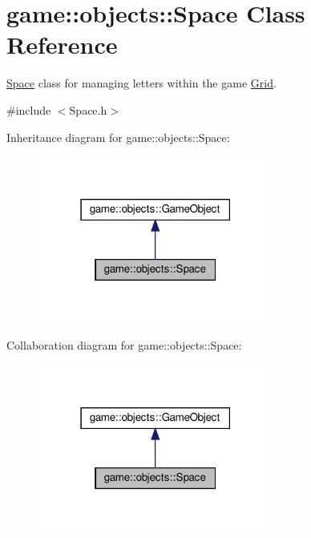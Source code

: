 \hypertarget{classgame_1_1objects_1_1Space}{}\section{game\+:\+:objects\+:\+:Space Class Reference}
\label{classgame_1_1objects_1_1Space}


\hyperlink{classgame_1_1objects_1_1Space}{Space} class for managing letters within the game \hyperlink{classgame_1_1objects_1_1Grid}{Grid}.  




{\ttfamily \#include $<$Space.\+h$>$}



Inheritance diagram for game\+:\+:objects\+:\+:Space\+:
\nopagebreak
\begin{figure}[H]
\begin{center}
\leavevmode
\includegraphics[width=219pt]{classgame_1_1objects_1_1Space__inherit__graph}
\end{center}
\end{figure}


Collaboration diagram for game\+:\+:objects\+:\+:Space\+:
\nopagebreak
\begin{figure}[H]
\begin{center}
\leavevmode
\includegraphics[width=219pt]{classgame_1_1objects_1_1Space__coll__graph}
\end{center}
\end{figure}
